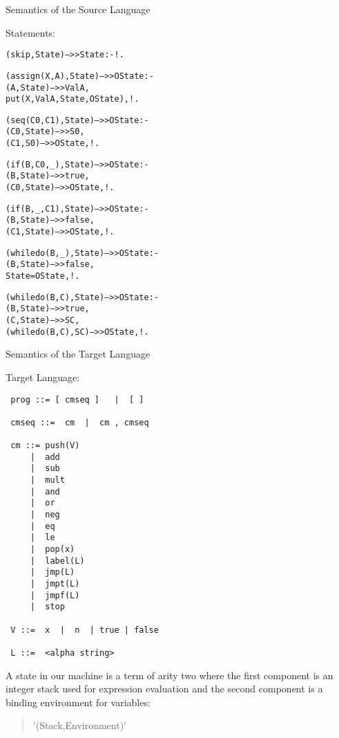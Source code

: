 \documentclass{beamer}
\begin{document}
\begin{frame}[fragile]{Semantics of the Source Language}

\scriptsize
Statements:

\tiny
\begin{alltt}
(skip,State) -->> State :- !.          % skip                                                                                                

(assign(X,A),State) -->> OState :-     % assignment                                                                                          
    (A,State) -->> ValA,
    put(X,ValA,State,OState),!.

(seq(C0,C1),State) -->> OState :-      % composition, seq                                                                                    
    (C0,State) -->> S0,
    (C1,S0) -->> OState,!.

(if(B,C0,_),State) -->> OState :-     % if                                                                                                   
    (B,State) -->> true,
    (C0,State) -->> OState,!.

(if(B,_,C1),State) -->> OState :-     % if                                                                                                   
    (B,State) -->> false,
    (C1,State) -->> OState,!.

(whiledo(B,_),State) -->> OState :-    % while                                                                                               
    (B,State) -->> false,
    State=OState,!.

(whiledo(B,C),State) -->> OState :-    % while                                                                                               
    (B,State) -->> true,
    (C,State) -->> SC,
    (whiledo(B,C),SC) -->> OState,!.
\end{alltt}
\end{frame}

\begin{frame}[fragile]{Semantics of the Target Language}

\scriptsize
Target Language:
\tiny
\begin{verbatim}
 prog ::= [ cmseq ]   |  [ ]

 cmseq ::=  cm  |  cm , cmseq

 cm ::= push(V)
     |  add
     |  sub
     |  mult
     |  and
     |  or
     |  neg
     |  eq
     |  le
     |  pop(x)
     |  label(L)
     |  jmp(L)
     |  jmpt(L)
     |  jmpf(L)
     |  stop

 V ::=  x  |  n  | true | false

 L ::=  <alpha string>
\end{verbatim}

 A state in our machine is a term of arity two where the first component
 is an integer stack used for expression evaluation and the second component
 is a binding environment for variables:
\begin{quote}
    '(Stack,Environment)'
\end{quote}

\end{frame}
\end{document}
